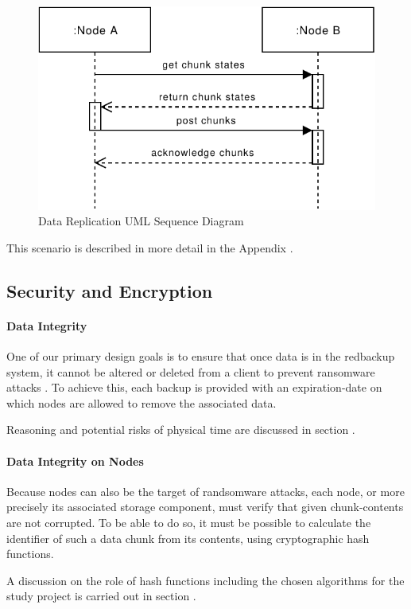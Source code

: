 \begin{figure}[h]
    \centering
    \includegraphics[width=0.6\linewidth]{resources/data_replication.pdf}
    \caption{Data Replication UML Sequence Diagram}
\end{figure}

This scenario is described in more detail in the Appendix .

\subsection{Security and Encryption}\label{sec:security-and-encryption}
\paragraph{Data Integrity} One of our primary design goals is to ensure that once data is in the redbackup system, it cannot be altered or deleted from a \gls{client} to prevent ransomware attacks \cite{young-cryptovirology}. To achieve this, each backup is provided with an \gls{expiration-date} on which \glspl{node} are allowed to remove the associated data. 

Reasoning and potential risks of physical time are discussed in section .

\paragraph{Data Integrity on Nodes} Because \glspl{node} can also be the target of randsomware attacks, each \gls{node}, or more precisely its associated \gls{storage} component, must verify that given \glspl{chunk-content} are not corrupted. To be able to do so, it must be possible to calculate the identifier of such a data \gls{chunk} from its contents, using cryptographic hash functions.

A discussion on the role of hash functions including the chosen algorithms for the study project is carried out in section .

